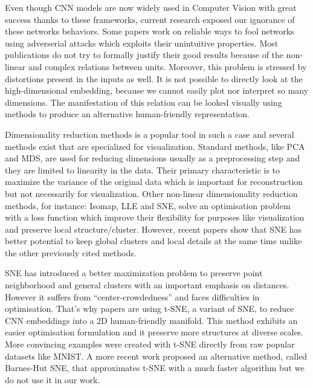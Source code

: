 \documentclass[a4paper,12pt]{report}
\begin{document}
Even though CNN models are now widely used in Computer Vision with great success thanks to these frameworks, current research exposed our ignorance of these networks behaviors.
Some papers work on reliable ways to fool networks using adverserial attacks which exploits their unintuitive properties\cite{szegedy2013intriguing}.
Most publications do not try to formally justify their good results because of the non-linear and complex relations between units. %
Moreover, this problem is stressed by distortions present in the inputs as well.
It is not possible to directly look at the high-dimensional embedding, because we cannot easily plot nor interpret so many dimensions.
The manifestation of this relation can be looked visually using methods to produce an alternative human-friendly representation.

Dimensionality reduction methods is a popular tool in such a case\cite{dai2014document}\cite{taylor2011learning} and several methods exist that are specialized for visualization.
Standard methods, like PCA and MDS\cite{cox2000multidimensional}, are used for reducing dimensions usually as a preprocessing step and they are limited to linearity in the data.
Their primary characteristic is to maximize the variance of the original data which is important for reconstruction but not necessarily for visualization.
Other non-linear dimensionality reduction methods, for instance: Isomap\cite{tenenbaum2000global}, LLE\cite{roweis2000nonlinear} and SNE\cite{SNE}, solve an optimisation problem with a loss function which improve their flexibility for purposes like visualization and preserve local structure/cluster.
However, recent papers show that SNE has better potential to keep global clusters and local details at the same time unlike the other previously cited methods\cite{SNE}.

SNE has introduced a better maximization problem to preserve point neighborhood and general clusters with an important emphasis on distances\cite{SNE}.
However it suffers from ``center-crowdedness'' and faces difficulties in optimisation\cite{t-SNE}.
That's why papers are using t-SNE, a variant of SNE, to reduce CNN embeddings into a 2D human-friendly manifold. %
This method exhibits an easier optimisation formulation and it preserve more structures at diverse scales.
More convincing examples were created with t-SNE directly from raw popular datasets\cite{van2009new} like MNIST\cite{t-SNE}.
A more recent work proposed an alternative method, called Barnes-Hut SNE, that approximates t-SNE with a much faster algorithm but we do not use it in our work.
\end{document}
